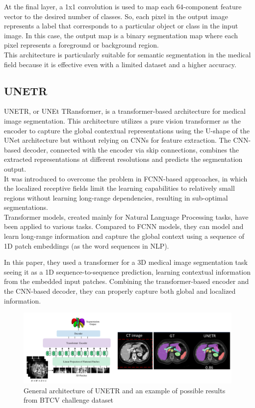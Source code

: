 At the final layer, a 1x1 convolution is used to map each 64-component feature vector to the desired number of classes. So, each pixel in the output image represents a label that corresponds to a particular object or class in the input image. In this case, the output map is a binary segmentation map where each pixel represents a foreground or background region.\\

This architecture is particularly suitable for semantic segmentation in the medical field because it is effective even with a limited dataset and a higher accuracy.

\subsection{UNETR}

UNETR\cite{hatamizadeh2022unetr}, or UNEt TRansformer, is a transformer-based architecture for medical image segmentation. This architecture utilizes a pure vision transformer as the encoder to capture the global contextual representations using the U-shape of the UNet architecture \cite{ronneberger2015u} but without relying on CNNs for feature extraction. The CNN-based decoder, connected with the encoder via skip connections, combines the extracted representations at different resolutions and predicts the segmentation output.\\

It was introduced to overcome the problem in FCNN-based approaches, in which the localized receptive fields limit the learning capabilities to relatively small regions without learning long-range dependencies, resulting in sub-optimal segmentations.\\
Transformer models, created mainly for Natural Language Processing tasks, have been applied to various tasks. Compared to FCNN models, they can model and learn long-range information and capture the global context using a sequence of 1D patch embeddings (as the word sequences in NLP).

In this paper, they used a transformer for a 3D medical image segmentation task seeing it as a 1D sequence-to-sequence prediction, learning contextual information from the embedded input patches. Combining the transformer-based encoder and the CNN-based decoder, they can properly capture both global and localized information.

\begin{figure}[H]
    \centering
    \includegraphics[scale=0.3]{images/unetr_1.png}
    \caption{General architecture of UNETR and an example of possible results from BTCV challenge dataset \cite{landman2015miccai}}
    \label{fig:unetr1-architecture}
\end{figure}

